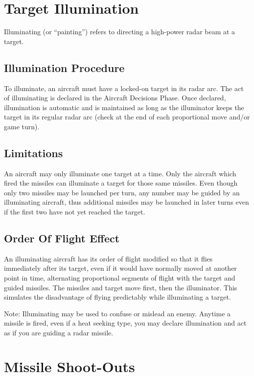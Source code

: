 \section{Target Illumination}
\label{rule:target-illumination}

Illuminating (or “painting”) refers to directing a high-power radar beam at a target.

\subsection{Illumination Procedure} To illuminate, an aircraft must have a locked-on target in its radar arc. The act of illuminating is declared in the Aircraft Decisions Phase. Once declared, illumination is automatic and is maintained as long as the illuminator keeps the target in its regular radar arc (check at the end of each proportional move and/or game turn).

\subsection{Limitations} An aircraft may only illuminate one target at a time. Only the aircraft which fired the missiles can illuminate a target for those same missiles. Even though only two missiles may be launched per turn, any number may be guided by an illuminating aircraft, thus additional missiles may be launched in later turns even if the first two have not yet reached the target.

\subsection{Order Of Flight Effect} An illuminating aircraft has its order of flight modified so that it flies immediately after its target, even if it would have normally moved at another point in time, alternating proportional segments of flight with the target and guided missiles. The missiles and target move first, then the illuminator. This simulates the disadvantage of flying predictably while illuminating a target.

Note: Illuminating may be used to confuse or mislead an enemy. Anytime a missile is fired, even if a heat seeking type, you may declare illumination and act as if you are guiding a radar missile.

\section{Missile Shoot-Outs}
\label{rule:missile-shoot-outs}

